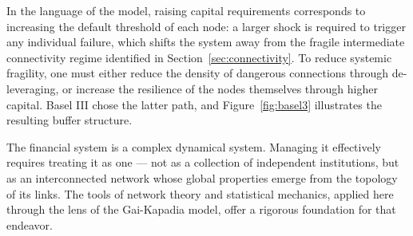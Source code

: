 \documentclass[a4paper,12pt,twoside]{article}
\begin{document}
In the language of the model, raising capital requirements corresponds 
to increasing the default threshold of each node: a larger shock is 
required to trigger any individual failure, which shifts the system 
away from the fragile intermediate connectivity regime identified in 
Section~\ref{sec:connectivity}. To reduce systemic fragility, one must 
either reduce the density of dangerous connections through 
de-leveraging, or increase the resilience of the nodes themselves 
through higher capital. Basel III chose the latter path, and 
Figure~\ref{fig:basel3} illustrates the resulting buffer structure.

The financial system is a complex dynamical system. Managing it 
effectively requires treating it as one — not as a collection of 
independent institutions, but as an interconnected network whose 
global properties emerge from the topology of its links. The tools of 
network theory and statistical mechanics, applied here through the 
lens of the Gai-Kapadia model, offer a rigorous foundation for that 
endeavor.
\end{document}
